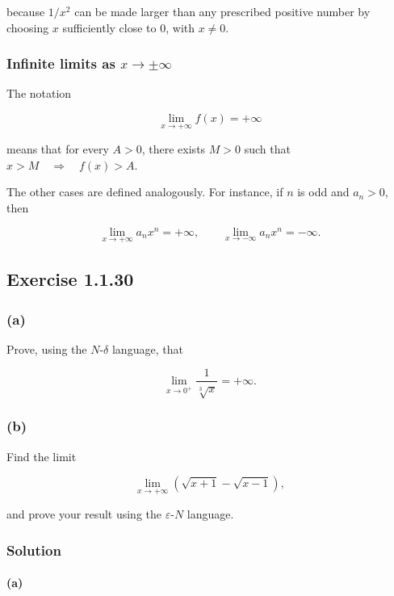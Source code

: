 \documentclass[11pt,a4paper]{article}
\begin{document}
because \(1/x^2\) can be made larger than any prescribed positive number
by choosing \(x\) sufficiently close to \(0\), with \(x\neq0\).

\subsubsection{\texorpdfstring{Infinite limits as
\(x\to\pm\infty\)}{Infinite limits as x\textbackslash to\textbackslash pm\textbackslash infty}}\label{infinite-limits-as-xtopminfty}

The notation

\[
\lim_{x\to+\infty}f(x)=+\infty
\]

means that for every \(A>0\), there exists \(M>0\) such that
\(x>M\quad\Longrightarrow\quad f(x)>A.\)

The other cases are defined analogously. For instance, if \(n\) is odd
and \(a_n>0\), then

\[
\lim_{x\to+\infty}a_nx^n=+\infty,
\qquad
\lim_{x\to-\infty}a_nx^n=-\infty.
\]

\subsection{Exercise 1.1.30}\label{exercise-1.1.30}

\subsubsection{(a)}\label{a}

Prove, using the \(N\)-\(\delta\) language, that

\[
\lim_{x\to0^+}\frac{1}{\sqrt[3]{x}}=+\infty.
\]

\subsubsection{(b)}\label{b}

Find the limit

\[
\lim_{x\to+\infty}\left(\sqrt{x+1}-\sqrt{x-1}\right),
\]

and prove your result using the \(\varepsilon\)-\(N\) language.

\subsubsection{Solution}\label{solution}

\paragraph{(a)}\label{a-1}
\end{document}

